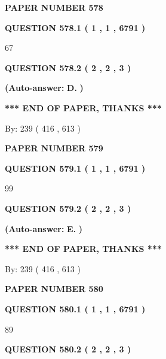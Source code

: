 \documentclass{ctexart}
\begin{document}
   
\newpage 
\setcounter{page}{ 
   578001 } 
   
   
 {\textbf{ \Large{ PAPER NUMBER  578  }}}
   
   
   
   
  
  
{\textbf{\large{QUESTION
578.1 
 ( 1 , 1 , 6791 )
}}}

67
  
  
{\textbf{\large{QUESTION
578.2 
 ( 2 , 2 , 3 )
}}}
 
 
{\textbf{(Auto-answer:}}
{\textbf{\large{
D.}}}
{\textbf{)}}
 
 
   
   
   
   
\vspace{1.0in} 
{\textbf{\large{ *** END OF PAPER, THANKS *** }}} 
   
   
\hspace{1.0in} By: 
 239 ( 416 ,  613 )
   
   
   
   
\newpage 
\setcounter{page}{ 
   579001 } 
   
   
 {\textbf{ \Large{ PAPER NUMBER  579  }}}
   
   
   
   
  
  
{\textbf{\large{QUESTION
579.1 
 ( 1 , 1 , 6791 )
}}}

99
  
  
{\textbf{\large{QUESTION
579.2 
 ( 2 , 2 , 3 )
}}}
 
 
{\textbf{(Auto-answer:}}
{\textbf{\large{
E.}}}
{\textbf{)}}
 
 
   
   
   
   
\vspace{1.0in} 
{\textbf{\large{ *** END OF PAPER, THANKS *** }}} 
   
   
\hspace{1.0in} By: 
 239 ( 416 ,  613 )
   
   
   
   
\newpage 
\setcounter{page}{ 
   580001 } 
   
   
 {\textbf{ \Large{ PAPER NUMBER  580  }}}
   
   
   
   
  
  
{\textbf{\large{QUESTION
580.1 
 ( 1 , 1 , 6791 )
}}}

89
  
  
{\textbf{\large{QUESTION
580.2 
 ( 2 , 2 , 3 )
}}}
 
\end{document}

